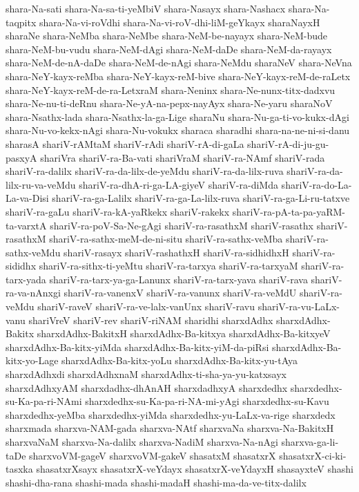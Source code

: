 {shara-Na-sati
shara-Na-sa-ti-yeMbiV
shara-Nasayx
shara-Nashacx
shara-Na-taqpitx
shara-Na-vi-roVdhi
shara-Na-vi-roV-dhi-liM-geYkayx
sharaNayxH
sharaNe
shara-NeMba
shara-NeMbe
shara-NeM-be-nayayx
shara-NeM-bude
shara-NeM-bu-vudu
shara-NeM-dAgi
shara-NeM-daDe
shara-NeM-da-rayayx
shara-NeM-de-nA-daDe
shara-NeM-de-nAgi
shara-NeMdu
sharaNeV
shara-NeVna
shara-NeY-kayx-reMba
shara-NeY-kayx-reM-bive
shara-NeY-kayx-reM-de-raLetx
shara-NeY-kayx-reM-de-ra-LetxraM
shara-Neninx
shara-Ne-nunx-titx-dadxvu
shara-Ne-nu-ti-deRnu
shara-Ne-yA-na-pepx-nayAyx
shara-Ne-yaru
sharaNoV
shara-Nsathx-lada
shara-Nsathx-la-ga-Lige
sharaNu
shara-Nu-ga-ti-vo-kukx-dAgi
shara-Nu-vo-kekx-nAgi
shara-Nu-vokukx
sharaca
sharadhi
shara-na-ne-ni-si-danu
sharasA
shariV-rAMtaM
shariV-rAdi
shariV-rA-di-gaLa
shariV-rA-di-ju-gu-pasxyA
shariVra
shariV-ra-Ba-vati
shariVraM
shariV-ra-NAmf
shariV-rada
shariV-ra-dalilx
shariV-ra-da-lilx-de-yeMdu
shariV-ra-da-lilx-ruva
shariV-ra-da-lilx-ru-va-veMdu
shariV-ra-dhA-ri-ga-LA-giyeV
shariV-ra-diMda
shariV-ra-do-La-La-va-Disi
shariV-ra-ga-Lalilx
shariV-ra-ga-La-lilx-ruva
shariV-ra-ga-Li-ru-tatxve
shariV-ra-gaLu
shariV-ra-kA-yaRkekx
shariV-rakekx
shariV-ra-pA-ta-pa-yaRM-ta-varxtA
shariV-ra-poV-Sa-Ne-gAgi
shariV-ra-rasathxM
shariV-rasathx
shariV-rasathxM
shariV-ra-sathx-meM-de-ni-situ
shariV-ra-sathx-veMba
shariV-ra-sathx-veMdu
shariV-rasayx
shariV-rashathxH
shariV-ra-sidhidhxH
shariV-ra-sididhx
shariV-ra-sithx-ti-yeMtu
shariV-ra-tarxya
shariV-ra-tarxyaM
shariV-ra-tarx-yada
shariV-ra-tarx-ya-ga-Lanunx
shariV-ra-tarx-yava
shariV-rava
shariV-ra-va-nAnxgi
shariV-ra-vanenxV
shariV-ra-vanunx
shariV-ra-veMdU
shariV-ra-veMdu
shariV-raveV
shariV-ra-ve-lalx-vanUnx
shariV-ravu
shariV-ra-vu-LaLx-vanu
shariVreV
shariV-rev
shariV-riNAM
sharidhi
sharxdAdhx
sharxdAdhx-Bakitx
sharxdAdhx-BakitxH
sharxdAdhx-Ba-kitxya
sharxdAdhx-Ba-kitxyeV
sharxdAdhx-Ba-kitx-yiMda
sharxdAdhx-Ba-kitx-yiM-da-piRsi
sharxdAdhx-Ba-kitx-yo-Lage
sharxdAdhx-Ba-kitx-yoLu
sharxdAdhx-Ba-kitx-yu-tAya
sharxdAdhxdi
sharxdAdhxnaM
sharxdAdhx-ti-sha-ya-yu-katxsayx
sharxdAdhxyAM
sharxdadhx-dhAnAH
sharxdadhxyA
sharxdedhx
sharxdedhx-su-Ka-pa-ri-NAmi
sharxdedhx-su-Ka-pa-ri-NA-mi-yAgi
sharxdedhx-su-Kavu
sharxdedhx-yeMba
sharxdedhx-yiMda
sharxdedhx-yu-LaLx-va-rige
sharxdedx
sharxmada
sharxva-NAM-gada
sharxva-NAtf
sharxvaNa
sharxva-Na-BakitxH
sharxvaNaM
sharxva-Na-dalilx
sharxva-NadiM
sharxva-Na-nAgi
sharxva-ga-li-taDe
sharxvoVM-gageV
sharxvoVM-gakeV
shasatxM
shasatxrX
shasatxrX-ci-ki-tasxka
shasatxrXsayx
shasatxrX-veYdayx
shasatxrX-veYdayxH
shasayxteV
shashi
shashi-dha-rana
shashi-mada
shashi-madaH
shashi-ma-da-ve-titx-dalilx
}
